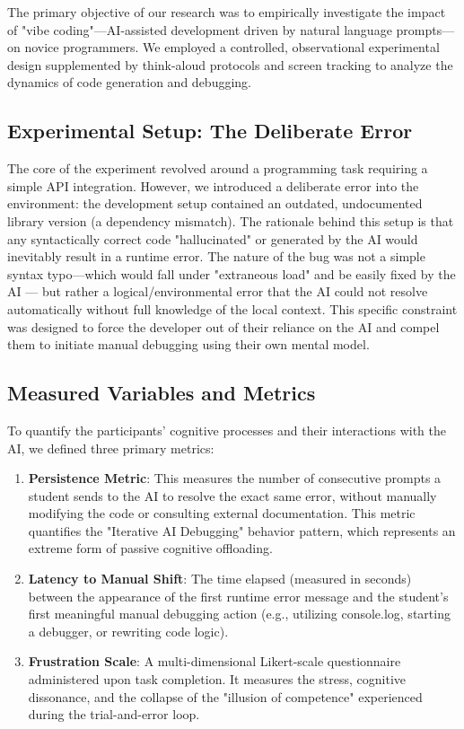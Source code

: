 \documentclass[../main.tex]{subfiles}
\begin{document}
The primary objective of our research was to empirically investigate the impact of "vibe coding"—AI-assisted development 
driven by natural language prompts—on novice programmers. We employed a controlled, observational experimental design 
supplemented by think-aloud protocols and screen tracking to analyze the dynamics of code generation and debugging.
\cite{prather2018metacognitive} \cite{prather2024widening}

\subsection{Experimental Setup: The Deliberate Error}
The core of the experiment revolved around a programming task requiring a simple API integration. However, we introduced 
a deliberate error into the environment: the development setup contained an outdated, undocumented library version (a dependency mismatch).
The rationale behind this setup is that any syntactically correct code "hallucinated" or generated by the AI would inevitably result in a runtime error. 
The nature of the bug was not a simple syntax typo—which would fall under "extraneous load" and be easily fixed by the 
AI — but rather a logical/environmental error that the AI could not resolve automatically without full knowledge of the local context. This specific constraint was designed to force the developer out of their reliance on the AI and compel them to initiate manual debugging using their own mental model.

\subsection{Measured Variables and Metrics}

To quantify the participants' cognitive processes and their interactions with the AI, we defined three primary metrics:
\begin{enumerate}
    \item \textbf{Persistence Metric}: This measures the number of consecutive prompts a student sends to the AI to resolve the exact same error, without manually modifying the code or consulting external documentation. This metric quantifies the "Iterative AI Debugging" behavior pattern, which represents an extreme form of passive cognitive offloading. \cite{shen2026how}
    \item \textbf{Latency to Manual Shift}: The time elapsed (measured in seconds) between the appearance of the first runtime error message and the student's first meaningful manual debugging action (e.g., utilizing console.log, starting a debugger, or rewriting code logic).
    \item \textbf{Frustration Scale}: A multi-dimensional Likert-scale questionnaire administered upon task completion. It measures the stress, cognitive dissonance, and the collapse of the "illusion of competence" experienced during the trial-and-error loop. \cite{prather2024widening}
\end{enumerate}
\end{document}
